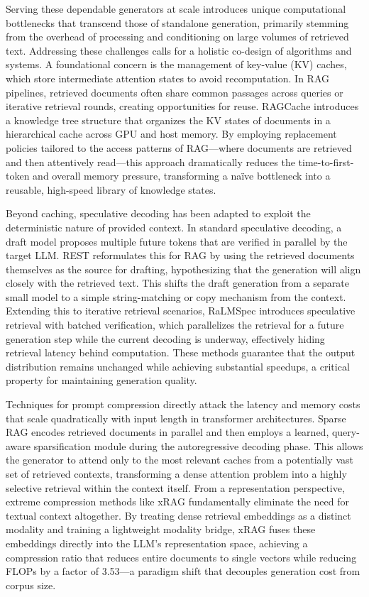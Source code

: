 \documentclass[11pt,a4paper]{article}
\begin{document}
Serving these dependable generators at scale introduces unique computational bottlenecks that transcend those of standalone generation, primarily stemming from the overhead of processing and conditioning on large volumes of retrieved text. Addressing these challenges calls for a holistic co-design of algorithms and systems. A foundational concern is the management of key-value (KV) caches, which store intermediate attention states to avoid recomputation. In RAG pipelines, retrieved documents often share common passages across queries or iterative retrieval rounds, creating opportunities for reuse. RAGCache introduces a knowledge tree structure that organizes the KV states of documents in a hierarchical cache across GPU and host memory. By employing replacement policies tailored to the access patterns of RAG---where documents are retrieved and then attentively read---this approach dramatically reduces the time-to-first-token and overall memory pressure, transforming a na\"{i}ve bottleneck into a reusable, high-speed library of knowledge states.

Beyond caching, speculative decoding has been adapted to exploit the deterministic nature of provided context. In standard speculative decoding, a draft model proposes multiple future tokens that are verified in parallel by the target LLM. REST reformulates this for RAG by using the retrieved documents themselves as the source for drafting, hypothesizing that the generation will align closely with the retrieved text. This shifts the draft generation from a separate small model to a simple string-matching or copy mechanism from the context. Extending this to iterative retrieval scenarios, RaLMSpec introduces speculative retrieval with batched verification, which parallelizes the retrieval for a future generation step while the current decoding is underway, effectively hiding retrieval latency behind computation. These methods guarantee that the output distribution remains unchanged while achieving substantial speedups, a critical property for maintaining generation quality.

Techniques for prompt compression directly attack the latency and memory costs that scale quadratically with input length in transformer architectures. Sparse RAG encodes retrieved documents in parallel and then employs a learned, query-aware sparsification module during the autoregressive decoding phase. This allows the generator to attend only to the most relevant caches from a potentially vast set of retrieved contexts, transforming a dense attention problem into a highly selective retrieval within the context itself. From a representation perspective, extreme compression methods like xRAG \cite{arxiv:2405.13792v1} fundamentally eliminate the need for textual context altogether. By treating dense retrieval embeddings as a distinct modality and training a lightweight modality bridge, xRAG fuses these embeddings directly into the LLM's representation space, achieving a compression ratio that reduces entire documents to single vectors while reducing FLOPs by a factor of 3.53---a paradigm shift that decouples generation cost from corpus size.
\end{document}
